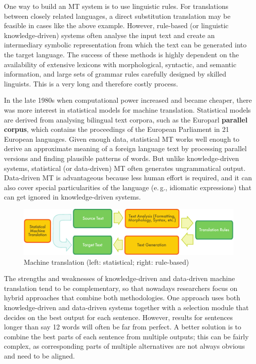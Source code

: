 \begin{multicols}{2}
One way to build an MT system is to use linguistic rules. For translations between closely related languages, a direct substitution translation may be feasible in cases like the above example. However, rule-based (or linguistic knowledge-driven) systems often analyse the input text and create an intermediary symbolic representation from which the text can be generated into the target language. The success of these methods is highly dependent on the availability of extensive lexicons with morphological, syntactic, and semantic information, and large sets of grammar rules carefully designed by skilled linguists. This is a very long and therefore costly process.

In the late 1980s when computational power increased and became cheaper, there was more interest in statistical models for machine translation. Statistical models are derived from analysing bilingual text corpora, such as the Europarl \textbf{parallel corpus}, which contains the proceedings of the European Parliament in 21 European languages. Given enough data, statistical MT works well enough to derive an approximate meaning of a foreign language text by processing parallel versions and finding plausible patterns of words. But unlike knowledge-driven systems, statistical (or data-driven) MT often generates ungrammatical output.  Data-driven MT is advantageous because less human effort is required, and it can also cover special particularities of the language (e.\,g., idiomatic expressions) that can get ignored in knowledge-driven systems.

\begin{figure}[htb]
  \center
  \includegraphics[width=\textwidth]{../_media/english/machine_translation}
  \caption{Machine translation (left: statistical; right: rule-based)}
\label{fig:mtarch_en}
\end{figure}

The strengths and weaknesses of knowledge-driven and data-driven machine translation tend to be complementary, so that nowadays researchers focus on hybrid approaches that combine both methodologies. One approach uses both knowledge-driven and data-driven systems together with a selection module that decides on the best output for each sentence. However, results for sentences longer than say 12 words will often be far from perfect. A better solution is to combine the best parts of each sentence from multiple outputs; this can be fairly complex, as corresponding parts of multiple alternatives are not always obvious and need to be aligned.


\end{multicols}
